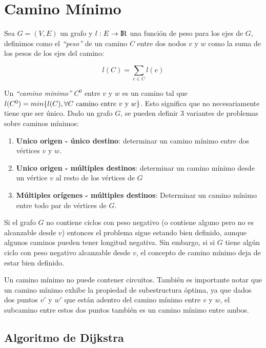 \newpage
\section{Camino M\'inimo}

Sea $G = (V, E)$ un grafo y $l: E \rightarrow {\rm I\!R}$ una funci\'on de peso para los ejes de $G$, definimos como el \emph{``peso''} de un camino $C$ entre dos nodos $v$ y $w$ como la suma de los pesos de los ejes del camino:

\begin{equation}
l(C) = \sum_{e \in C} l(e)
\end{equation}

Un \emph{``camino minimo''} $C^0$ entre $v$ y $w$ es un camino tal que $l(C^0) = min \{ l(C), \forall \textrm{$ C$ camino entre $v$ y $w$}  \}$. Esto significa que no necesariamente tiene que ser \'unico. Dado un grafo $G$, se pueden definir 3 variantes de problemas sobre caminos m\'inimos:

\begin{enumerate}
\item \textbf{Unico origen - \'unico destino}: determinar un camino m\'inimo entre dos v\'ertices $v$ y $w$.
\item \textbf{Unico origen - m\'ultiples destinos}: determinar un camino m\'inimo desde un v\'ertice $v$ al resto de los v\'ertices de $G$
\item \textbf{M\'ultiples or\'igenes - m\'ultiples destinos}: Determinar un camino m\'inimo entre todo par de v\'ertices de $G$.
\end{enumerate}

Si el grafo $G$ no contiene ciclos con peso negativo (o contiene alguno pero no es alcanzable desde $v$) entonces el problema sigue estando bien definido, aunque algunos caminos pueden tener longitud negativa. Sin embargo, si si $G$ tiene alg\'un ciclo con peso negativo alcanzable desde $v$, el concepto de camino m\'inimo deja de estar bien definido.

Un camino m\'inimo no puede contener circuitos. Tambi\'en es importante notar que un camino m\'inimo exhibe la propiedad de subestructura \'optima, ya que dados dos puntos $v'$ y $w'$ que est\'an adentro del camino m\'inimo entre $v$ y $w$, el subcamino entre estos dos puntos tambi\'en es un camino m\'inimo entre ambos.

\newpage
\subsection{Algoritmo de Dijkstra}

